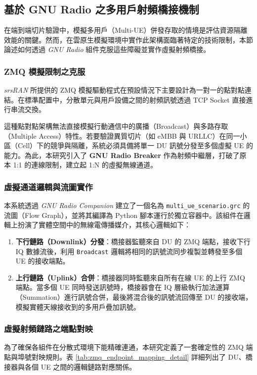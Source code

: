 \subsection{基於 GNU Radio 之多用戶射頻橋接機制}
\label{subsec:gnuradio_bridge}

在端到端切片驗證中，模擬多用戶（Multi-UE）併發存取的情境是評估資源隔離效能的關鍵。然而，在雲原生模擬環境中實作此架構面臨著特定的技術限制，本節論述如何透過 \textit{GNU Radio} 組件克服這些障礙並實作虛擬射頻橋接。

\subsubsection{ZMQ 模擬限制之克服}
\textit{srsRAN} 所提供的 ZMQ 模擬驅動程式在預設情況下主要設計為一對一的點對點連結。在標準配置中，分散單元與用戶設備之間的射頻訊號透過 TCP Socket 直接進行串流交換。

這種點對點架構無法直接模擬行動通信中的廣播（Broadcast）與多路存取（Multiple Access）特性。若要驗證異質切片（如 eMBB 與 URLLC）在同一小區（Cell）下的競爭與隔離，系統必須具備將單一 DU 訊號分發至多個虛擬 UE 的能力。為此，本研究引入了 \textbf{GNU Radio Breaker} 作為射頻中繼層，打破了原本 1:1 的連線限制，建立起 1:N 的虛擬無線通道。

\subsubsection{虛擬通道邏輯與流圖實作}
本系統透過 \textit{GNU Radio Companion} 建立了一個名為 \texttt{multi\_ue\_scenario.grc} 的流圖（Flow Graph），並將其編譯為 Python 腳本運行於獨立容器中。該組件在邏輯上扮演了實體空間中的無線電傳播媒介，其核心邏輯如下：

\begin{enumerate}
    \item \textbf{下行鏈路（Downlink）分發}：橋接器監聽來自 DU 的 ZMQ 端點，接收下行 IQ 數據流後，利用 \texttt{Broadcast} 邏輯將相同的訊號流同步複製並轉發至多個 UE 的接收端點。
    \item \textbf{上行鏈路（Uplink）合併}：橋接器同時監聽來自所有在線 UE 的上行 ZMQ 端點。當多個 UE 同時發送訊號時，橋接器會在 IQ 層級執行加法運算（Summation）進行訊號合併，最後將混合後的訊號流回傳至 DU 的接收端，模擬實體天線接收到的多用戶疊加訊號。
\end{enumerate}

\subsubsection{虛擬射頻鏈路之端點對映}
為了確保各組件在分散式環境下能精確連通，本研究定義了一套確定性的 ZMQ 端點與埠號對映規則。表 \ref{tab:zmq_endpoint_mapping_detail} 詳細列出了 DU、橋接器與各個 UE 之間的邏輯鏈路對應關係。

